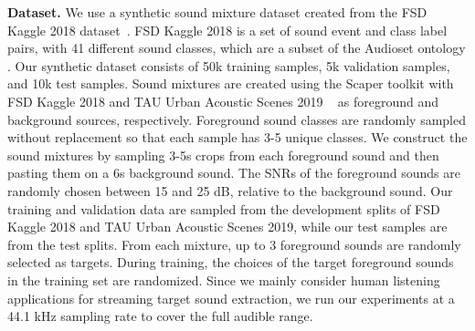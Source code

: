 {\bf Dataset.} We use a synthetic sound mixture dataset created from the  FSD Kaggle 2018 dataset~\cite{Fonseca2018_DCASE}. FSD Kaggle 2018 is a set of sound event and class label pairs, with 41 different sound classes, which are a subset of the Audioset ontology \cite{gemmeke2017audio}. Our synthetic dataset consists of 50k training samples, 5k validation samples, and 10k test samples. {Sound mixtures are created using the Scaper toolkit \cite{8170052} with FSD Kaggle 2018 and TAU Urban Acoustic Scenes 2019 ~\cite{Mesaros2018_DCASE} as foreground and background sources, respectively}. Foreground sound classes are randomly sampled without replacement so that each sample has 3-5 unique classes. We construct the sound mixtures by sampling 3-5s crops from each foreground sound and then pasting them on a 6s background sound. The SNRs of the foreground sounds are randomly chosen between 15 and 25 dB, relative to the background sound. Our training and validation data are sampled from the development splits of FSD Kaggle 2018 and TAU Urban Acoustic Scenes 2019, while our test samples are  from the test splits.
From each mixture, up to 3 foreground sounds are randomly selected as targets.
During training, the choices of the target foreground sounds in the training set are randomized. Since we mainly consider human listening applications for streaming target sound extraction, we run  our experiments at a 44.1 kHz  sampling rate  to cover the full audible range.











